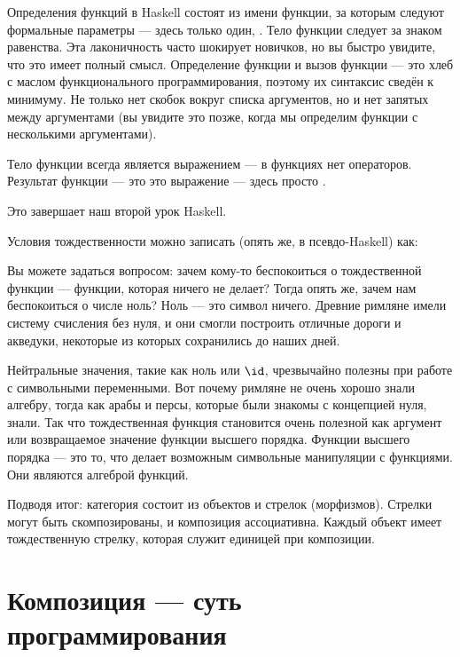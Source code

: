 Определения функций в Haskell состоят из имени функции,
за которым следуют формальные параметры --- здесь только один, . Тело
функции следует за знаком равенства. Эта лаконичность часто шокирует
новичков, но вы быстро увидите, что это имеет полный смысл. Определение функции
и вызов функции --- это хлеб с маслом функционального
программирования, поэтому их синтаксис сведён к минимуму. Не только нет
скобок вокруг списка аргументов, но и нет запятых
между аргументами (вы увидите это позже, когда мы определим функции с
несколькими аргументами).

Тело функции всегда является выражением --- в функциях нет
операторов. Результат функции --- это это выражение ---
здесь просто .

Это завершает наш второй урок Haskell.

Условия тождественности можно записать (опять же, в псевдо-Haskell) как:

Вы можете задаться вопросом: зачем кому-то беспокоиться о
тождественной функции --- функции, которая ничего не делает? Тогда опять же, зачем
нам беспокоиться о числе ноль? Ноль --- это символ ничего. Древние
римляне имели систему счисления без нуля, и они смогли построить
отличные дороги и акведуки, некоторые из которых сохранились до наших дней.

Нейтральные значения, такие как ноль или $\id$, чрезвычайно полезны при
работе с символьными переменными. Вот почему римляне не очень хорошо знали
алгебру, тогда как арабы и персы, которые были знакомы с
концепцией нуля, знали. Так что тождественная функция становится очень полезной как
аргумент или возвращаемое значение функции высшего порядка. Функции высшего порядка
--- это то, что делает возможным символьные манипуляции с функциями.
Они являются алгеброй функций.

Подводя итог: категория состоит из объектов и стрелок (морфизмов).
Стрелки могут быть скомпозированы, и композиция ассоциативна. Каждый объект
имеет тождественную стрелку, которая служит единицей при композиции.

\section{Композиция --- суть программирования}

